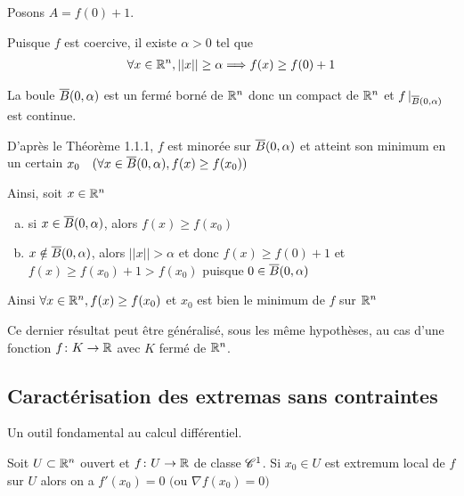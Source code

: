 \documentclass[french,a4paper,10pt]{article}
\begin{document}
	\begin{oc-proof}
		Posons $A=f(0)+1$.
		
		Puisque $f$ est coercive, il existe $\alpha>0$ tel que
			\[\begin{aligned}
				\forall x\in\mathbb{R}^n,||x||\ge\alpha\Longrightarrow f(x)\ge f(0)+1
			\end{aligned}\]
		
		La boule $\overline{B}(0, \alpha)$ est un fermé borné de $\mathbb{R}^n$ donc un compact de $\mathbb{R}^n$ et $f\mathop{}\!|_{\overline{B}(0, \alpha)}$ est continue.
		
		D'après le Théorème 1.1.1, $f$ est minorée sur $\overline{B}(0, \alpha)$ et atteint son minimum en un certain $x_0\quad(\forall x\in \overline{B}(0, \alpha), f(x)\ge f(x_0))$
		
		Ainsi, soit $x\in \mathbb{R}^n$
		\begin{enumerate}[a)]
			\item si $x\in \overline{B}(0, \alpha)$, alors $f(x)\ge f(x_0)$
			\item $x\notin \overline{B}(0, \alpha)$, alors $||x||>\alpha$ et donc $f(x)\ge f(0)+1$ et $f(x)\ge f(x_0)+1>f(x_0)$ puisque $0\in \overline{B}(0, \alpha)$
		\end{enumerate}
	
		Ainsi $\forall x\in\mathbb{R}^n,f(x)\ge f(x_0)$ et $x_0$ est bien le minimum de $f$ sur $\mathbb{R}^n$
		
	\end{oc-proof}

	\begin{oc-remark}
		Ce dernier résultat peut être généralisé, sous les même hypothèses, au cas d'une fonction $f\colon K\to\mathbb{R}$ avec $K$ fermé de $\mathbb{R}^n$.
		
	\end{oc-remark}

	\subsection{Caractérisation des extremas sans contraintes}
	
	Un outil fondamental au calcul différentiel.
	
	\begin{oc-theorem}
		Soit $U\subset \mathbb{R}^n$ ouvert et $f\colon U\to\mathbb{R}$ de classe $\mathscr{C}^1$. Si $x_0\in U$ est extremum local de $f$ sur $U$ alors on a $f'(x_0)=0$ $($ou $\nabla f(x_0)=0)$
		
	\end{oc-theorem}
\end{document}

